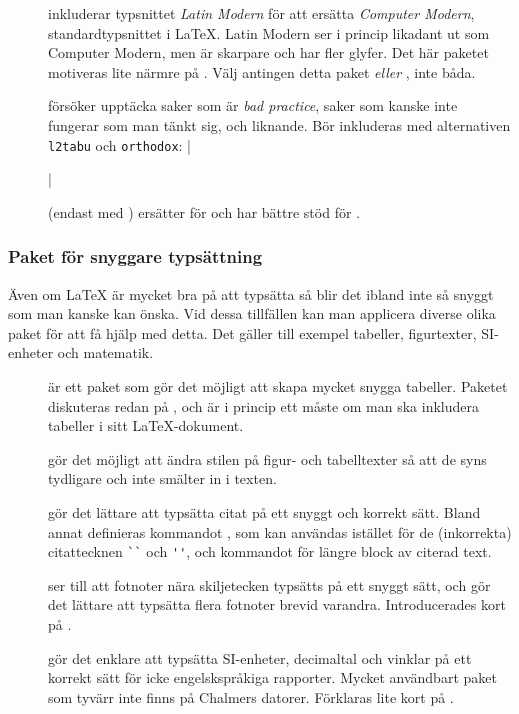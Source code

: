 \documentclass[lang=sv,ptsize=10pt,font=none,nomath,titles=bf,../../a4.tex]{subfiles}
\begin{document}
\begin{description}
	\item[]
	inkluderar typsnittet \emph{Latin Modern} för att ersätta
	\emph{Computer Modern}, standardtypsnittet i \LaTeX. Latin Modern ser
	i princip likadant ut som Computer Modern, men är skarpare och har
	fler glyfer. Det här paketet motiveras lite närmre på 
	. Välj antingen detta paket \emph{eller}
	, inte båda.
	
	\item[{}]
	försöker upptäcka saker som är \emph{bad practice}, saker som kanske
	inte fungerar som man tänkt sig, och liknande. Bör inkluderas med
	alternativen \texttt{l2tabu} och \texttt{orthodox}:
	\latex|\usepackage[l2tabu,orthodox]{nag}|

	\item[{}] (endast med \XeTeX)
	ersätter  för \XeTeX och har bättre stöd för \UTF.
\end{description}

\subsubsection{Paket för snyggare typsättning}
Även om \LaTeX{} är mycket bra på att typsätta så blir det ibland inte
så snyggt som man kanske kan önska. Vid dessa tillfällen kan man
applicera diverse olika paket för att få hjälp med detta. Det gäller
till exempel tabeller, figurtexter, SI-enheter och matematik.

\begin{description}
	\item[]
	är ett paket som gör det möjligt att skapa mycket snygga tabeller.
	Paketet diskuteras redan på , och är i princip
	ett måste om man ska inkludera tabeller i sitt \LaTeX-dokument.

	\item[]
	gör det möjligt att ändra stilen på figur- och tabelltexter så att de
	syns tydligare och inte smälter in i texten.

	\item[]
	gör det lättare att typsätta citat på ett snyggt och korrekt sätt.
	Bland annat definieras kommandot , som kan användas
	istället för de (inkorrekta) citattecknen \verb|``| och \verb|''|, 
	och kommandot  för längre block av citerad text.

	\item[]
	ser till att fotnoter nära skiljetecken typsätts på ett snyggt sätt,
	och gör det lättare att typsätta flera fotnoter brevid varandra.
	Introducerades kort på .
	
	\item[{}]
	gör det enklare att typsätta SI-enheter, decimaltal och vinklar på ett
	korrekt sätt för icke engelskspråkiga rapporter. Mycket användbart
	paket som tyvärr inte finns på Chalmers datorer. Förklaras lite kort
	på .
\end{description}
\end{document}
